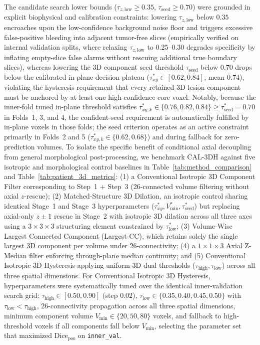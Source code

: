 \documentclass[11pt,a4paper]{article}
\begin{document}
The candidate search lower bounds ($\tau_{z,\mathrm{low}} \ge 0.35$, $\tau_{\mathrm{seed}} \ge 0.70$) were grounded in explicit biophysical and calibration constraints: lowering $\tau_{z,\mathrm{low}}$ below $0.35$ encroaches upon the low-confidence background noise floor and triggers excessive false-positive bleeding into adjacent tumor-free slices (empirically verified on internal validation splits, where relaxing $\tau_{z,\mathrm{low}}$ to $0.25$--$0.30$ degrades specificity by inflating empty-slice false alarms without rescuing additional true boundary slices), whereas lowering the 3D component seed threshold $\tau_{\mathrm{seed}}$ below $0.70$ drops below the calibrated in-plane decision plateau ($\tau_{xy}^* \in [0.62, 0.84]$, mean $0.74$), violating the hysteresis requirement that every retained 3D lesion component must be anchored by at least one high-confidence core voxel. Notably, because the inner-fold tuned in-plane threshold satisfies $\tau_{xy,k}^* \in \{0.76, 0.82, 0.84\} \ge \tau_{\text{seed}}^* = 0.70$ in Folds~1, 3, and 4, the confident-seed requirement is automatically fulfilled by in-plane voxels in those folds; the seed criterion operates as an active constraint primarily in Folds~2 and 5 ($\tau_{xy,k}^* \in \{0.62, 0.68\}$) and during fallback for zero-prediction volumes. To isolate the specific benefit of conditional axial decoupling from general morphological post-processing, we benchmark CAL-3DH against five isotropic and morphological control baselines in Table~\ref{tab:method_comparison} and Table~\ref{tab:patient_3d_metrics}: (1) a Conventional Isotropic 3D Component Filter corresponding to Step~1 + Step~3 (26-connected volume filtering without axial $z$-rescue); (2) Matched-Structure 3D Dilation, an isotropic control sharing identical Stage~1 and Stage~3 hyperparameters ($\tau_{xy}^*, V_{\min}^*, \tau_{\text{seed}}^*$) but replacing axial-only $z \pm 1$ rescue in Stage~2 with isotropic 3D dilation across all three axes using a $3 \times 3 \times 3$ structuring element constrained by $\tau_{\text{low}}^*$; (3) Volume-Wise Largest Connected Component (Largest-CC), which retains solely the single largest 3D component per volume under 26-connectivity; (4) a $1 \times 1 \times 3$ Axial Z-Median filter enforcing through-plane median continuity; and (5) Conventional Isotropic 3D Hysteresis applying uniform 3D dual thresholds ($\tau_{\text{high}}, \tau_{\text{low}}$) across all three spatial dimensions. For Conventional Isotropic 3D Hysteresis, hyperparameters were systematically tuned over the identical inner-validation search grid: $\tau_{\text{high}} \in [0.50, 0.90]$ (step $0.02$), $\tau_{\text{low}} \in \{0.35, 0.40, 0.45, 0.50\}$ with $\tau_{\text{low}} < \tau_{\text{high}}$, 26-connectivity propagation across all three spatial dimensions, minimum component volume $V_{\min} \in \{20, 50, 80\}$ voxels, and fallback to high-threshold voxels if all components fall below $V_{\min}$, selecting the parameter set that maximized $\text{Dice}_{\text{pos}}$ on \texttt{inner\_val}.
\end{document}
